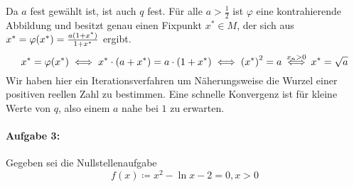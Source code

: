 \documentclass{scrreprt}
\begin{document}
Da $a$ fest gewählt ist, ist auch $q$ fest.
Für alle $a > \frac{1}{2}$ ist $\varphi$ eine kontrahierende Abbildung und
besitzt genau einen Fixpunkt $x^* \in M$, der sich aus
$x^* = \varphi\qty(x^*) = \frac{a\qty(1 + x^*)}{1 + x^*}$ ergibt.
\[
  x^* = \varphi\qty(x^*)
  \iff x^* \cdot (a + x^*) = a \cdot (1 + x^*)
  \iff \qty(x^*)^2 = a
  \overset{x_n > 0}\iff x^* = \sqrt{a}
\]
Wir haben hier ein Iterationsverfahren um Näherungsweise die Wurzel einer
positiven reellen Zahl zu bestimmen.
Eine schnelle Konvergenz ist für kleine Werte von $q$, also einem $a$ nahe bei
$1$ zu erwarten.

\paragraph{Aufgabe 3:} Gegeben sei die Nullstellenaufgabe
\[
  f(x) \coloneqq x^2 - \ln x  - 2 = 0, x > 0
\]
\end{document}
